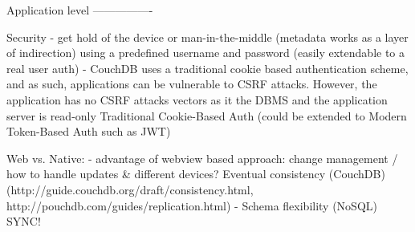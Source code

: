 \documentclass[thesis.tex]{subfiles}
\begin{document}
Application level
----------------

Security
- get hold of the device or man-in-the-middle (metadata works as a layer of indirection)
using a predefined username and password (easily extendable to a real user auth)
- CouchDB uses a traditional cookie based authentication scheme, and as such, applications can be vulnerable to CSRF attacks. However, the application has no CSRF attacks vectors as it the DBMS and the application server is read-only
Traditional Cookie-Based Auth (could be extended to Modern Token-Based Auth such as JWT)

Web vs. Native:
- advantage of webview based approach: change management / how to handle updates \& different devices?
Eventual consistency (CouchDB) (http://guide.couchdb.org/draft/consistency.html, http://pouchdb.com/guides/replication.html)
  - Schema flexibility (NoSQL) SYNC!
\end{document}
